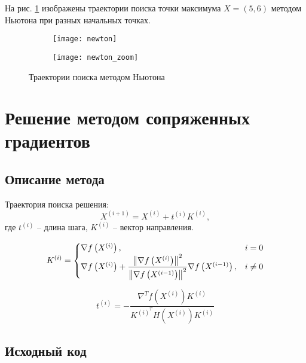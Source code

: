 На рис. \ref{fig:newton} изображены траектории поиска точки максимума $X = (5, 6)$ методом Ньютона при разных начальных точках.
\begin{figure}[H]
\begin{center}
	\begin{subfigure}[b]{0.49\textwidth}
		\texttt{[image: newton]}
	\end{subfigure}
	\begin{subfigure}[b]{0.49\textwidth}
		\texttt{[image: newton\_zoom]}
	\end{subfigure}
	\caption{Траектории поиска методом Ньютона}
	\label{fig:newton}
\end{center}
\end{figure}

\section{Решение методом сопряженных градиентов}

\subsection{Описание метода}

Траектория поиска решения:
\begin{equation*}
X^{(i+1)}  = X^{(i)} + t^{(i)} K^{(i)},
\end{equation*}
где $t^{(i)}$ -- длина шага, $K^{(i)}$ -- вектор направления.

\begin{equation*}
K^{(i)} = 
\begin{cases}
\nabla f\left(X^{(i)}\right), &i = 0\\
\nabla f\left(X^{(i)}\right) + \dfrac{\left\lVert\nabla f\left(X^{(i)}\right)\right\rVert^2}{\left\lVert\nabla f\left(X^{(i-1)}\right)\right\rVert^2} \nabla f\left(X^{(i-1)}\right), &i \neq 0
\end{cases}
\end{equation*}

\begin{equation*}
t^{(i)} = -\dfrac{\nabla^T f\left(X^{(i)}\right) K^{(i)}}{K^{(i)^T} H\left(X^{(i)}\right) K^{(i)}}
\end{equation*}

\subsection{Исходный код}



